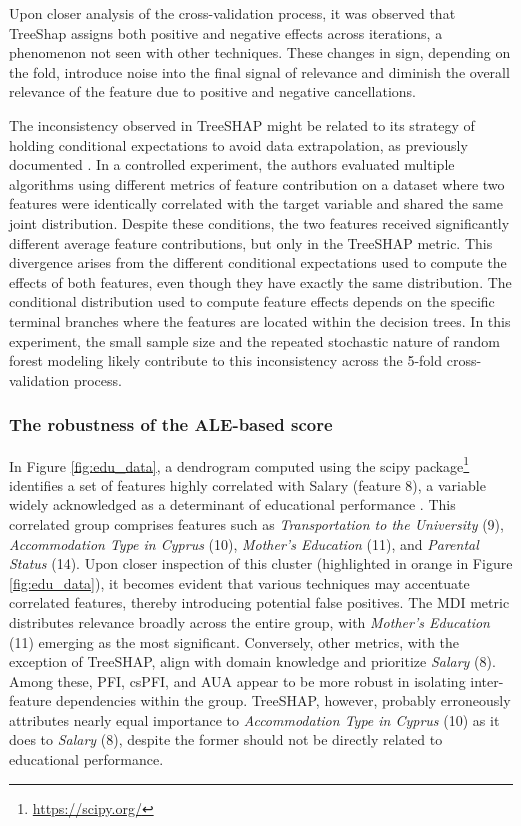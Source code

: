 Upon closer analysis of the cross-validation process, it was observed that TreeShap assigns both positive and negative effects across iterations, a phenomenon not seen with other techniques. These changes in sign, depending on the fold, introduce noise into the final signal of relevance and diminish the overall relevance of the feature due to positive and negative cancellations.

The inconsistency observed in TreeSHAP might be related to its strategy of holding conditional expectations to avoid data extrapolation, as previously documented \cite{SilvaFilho2023AAchievement}. In a controlled experiment, the authors evaluated multiple algorithms using different metrics of feature contribution on a dataset where two features were identically correlated with the target variable and shared the same joint distribution. Despite these conditions, the two features received significantly different average feature contributions, but only in the TreeSHAP metric. This divergence arises from the different conditional expectations used to compute the effects of both features, even though they have exactly the same distribution. The conditional distribution used to compute feature effects depends on the specific terminal branches where the features are located within the decision trees. In this experiment, the small sample size and the repeated stochastic nature of random forest modeling likely contribute to this inconsistency across the 5-fold cross-validation process.

\subsubsection{The robustness of the ALE-based score}

In Figure \ref{fig:edu_data}, a dendrogram computed using the scipy package\footnote{\url{https://scipy.org/}} identifies a set of features highly correlated with Salary (feature 8), a variable widely acknowledged as a determinant of educational performance \cite{coleman1968equality, coleman2019equality}. This correlated group comprises features such as \textit{Transportation to the University} (9), \textit{Accommodation Type in Cyprus} (10), \textit{Mother's Education} (11), and\textit{ Parental Status} (14). Upon closer inspection of this cluster (highlighted in orange in Figure \ref{fig:edu_data}), it becomes evident that various techniques may accentuate correlated features, thereby introducing potential false positives. The \gls{MDI} metric distributes relevance broadly across the entire group, with \textit{Mother's Education} (11) emerging as the most significant. Conversely, other metrics, with the exception of TreeSHAP, align with domain knowledge and prioritize \textit{Salary} (8). Among these, \gls{PFI}, \gls{csPFI}, and \gls{AUA} appear to be more robust in isolating inter-feature dependencies within the group. TreeSHAP, however, probably erroneously attributes nearly equal importance to \textit{Accommodation Type in Cyprus} (10) as it does to \textit{Salary} (8), despite the former should not be directly related to educational performance.



